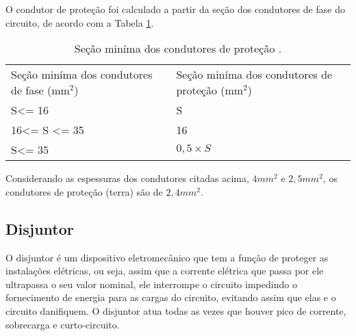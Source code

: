 O condutor de proteção foi calculado a partir da seção dos condutores de fase do circuito, de acordo com a Tabela \ref{secao}.


\begin{table}[H]
 \centering
 \caption{\label{secao}Seção miníma dos condutores de proteção \cite{protecao}.}
 {\renewcommand\arraystretch{1.25}
 \begin{tabular}{ l l }
  \cline{1-1}\cline{2-2}  
    \multicolumn{1}{|p{4.133cm}|}{Seção miníma dos condutores de fase (mm$^2$) \centering } &
    \multicolumn{1}{p{4.450cm}|}{Seção miníma dos condutores de proteção (mm$^2$) \centering }
  \\  
  \cline{1-1}\cline{2-2}  
    \multicolumn{1}{|p{4.133cm}|}{S\textless = 16 \centering } &
    \multicolumn{1}{p{4.450cm}|}{S \centering }
  \\  
  \cline{1-1}\cline{2-2}  
    \multicolumn{1}{|p{4.133cm}|}{16\textless = S \textless = 35 \centering } &
    \multicolumn{1}{p{4.450cm}|}{16 \centering }
  \\  
  \cline{1-1}\cline{2-2}  
    \multicolumn{1}{|p{4.133cm}|}{S\textless = 35 \centering } &
    \multicolumn{1}{p{4.450cm}|}{$0,5 \times S$ \centering }
  \\  
  \hline

 \end{tabular} }
\end{table}

Considerando as espessuras dos condutores citadas acima, $4mm^2$ e $2,5mm^2$, os condutores de proteção (terra) são de $2,4mm^2$.

\subsection{Disjuntor}

O disjuntor é um dispositivo eletromecânico que tem a função de proteger as instalações elétricas, ou seja,  assim que a corrente elétrica que passa por ele ultrapassa o seu valor nominal, ele interrompe o circuito impedindo o fornecimento de energia para as cargas do circuito, evitando assim que elas e o circuito danifiquem.
O disjuntor atua todas as vezes que houver pico de corrente, sobrecarga e curto-circuito.

